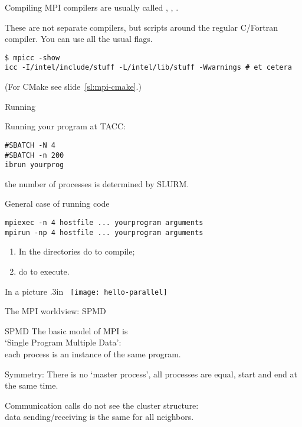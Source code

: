 \begin{numberedframe}{Compiling}
  MPI compilers are usually called ,
  , .

  These are not separate compilers,
  but scripts around the regular C/Fortran compiler. You can use all
  the usual flags.
\begin{verbatim}
$ mpicc -show
icc -I/intel/include/stuff -L/intel/lib/stuff -Wwarnings # et cetera
\end{verbatim}
\begin{full}
  (For CMake see slide~\ref{sl:mpi-cmake}.)
\end{full}
\end{numberedframe}

\begin{numberedframe}{Running}
\begin{tacc}
  Running your program at TACC:
\begin{verbatim}
#SBATCH -N 4
#SBATCH -n 200
ibrun yourprog
\end{verbatim}
  the number of processes is determined by SLURM.
\end{tacc}
General case of running code
\begin{verbatim}
mpiexec -n 4 hostfile ... yourprogram arguments
mpirun -np 4 hostfile ... yourprogram arguments
\end{verbatim}
\end{numberedframe}

\begin{exerciseframe}[hello]
  

  \begin{enumerate}
  \item In the directories  do 
     to compile;
  \item do  to execute.
  \end{enumerate}
\end{exerciseframe}

\begin{numberedframe}{In a picture}
  \moveleft .3in \hbox\bgroup
  \texttt{[image: hello-parallel]}
  \egroup
\end{numberedframe}

 {The MPI worldview: SPMD}

\begin{numberedframe}{SPMD}
  The basic model of MPI is\\
  `Single Program Multiple Data':\\
  each process is an instance of the same program.

  Symmetry: There is no `master process', all processes are equal,
  start and end
  at the same time.

  Communication calls do not see the cluster structure:\\
  data sending/receiving is the same for all neighbors.
\end{numberedframe}

